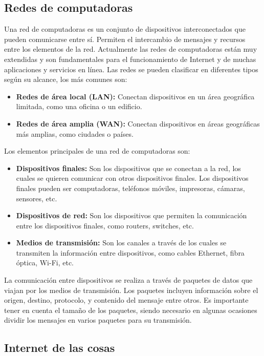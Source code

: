 \subsection{Redes de computadoras}
Una red de computadoras es un conjunto de dispositivos interconectados que pueden comunicarse entre sí. Permiten el intercambio de mensajes y recursos entre los elementos de la red. Actualmente las redes de computadoras están muy extendidas y son fundamentales para el funcionamiento de Internet y de muchas aplicaciones y servicios en línea.
Las redes se pueden clasificar en diferentes tipos según su alcance, los más comunes son:
\begin{itemize}
	\item \textbf{Redes de área local (LAN):} Conectan dispositivos en un área geográfica limitada, como una oficina o un edificio.
	\item \textbf{Redes de área amplia (WAN):} Conectan dispositivos en áreas geográficas más amplias, como ciudades o países.
\end{itemize}

Los elementos principales de una red de computadoras son:
\begin{itemize}
	\item \textbf{Dispositivos finales:} Son los dispositivos que se conectan a la red, los cuales se quieren comunicar con otros dispositivos finales. Los dispositivos finales pueden ser computadoras, teléfonos móviles, impresoras, cámaras, sensores, etc.
	\item \textbf{Dispositivos de red:} Son los dispositivos que permiten la comunicación entre los dispositivos finales, como routers, switches, etc.
	\item \textbf{Medios de transmisión:} Son los canales a través de los cuales se transmiten la información entre dispositivos, como cables Ethernet, fibra óptica, Wi-Fi, etc.
\end{itemize}

La comunicación entre dispositivos se realiza a través de paquetes de datos que viajan por los medios de transmisión. Los paquetes incluyen información sobre el origen, destino, protocolo, y contenido del mensaje entre otros. Es importante tener en cuenta el tamaño de los paquetes, siendo necesario en algunas ocasiones dividir los mensajes en varios paquetes para su transmisión.


\subsection{Internet de las cosas}

